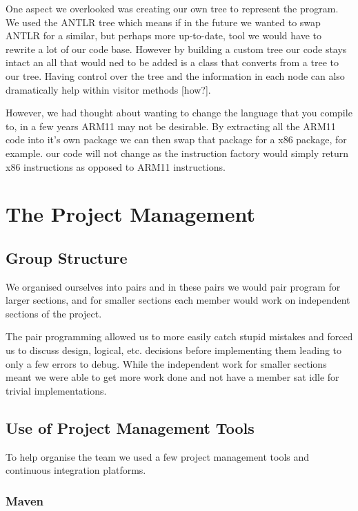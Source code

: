 \documentclass[11pt,a4paper]{article}
\begin{document}
One aspect we overlooked was creating our own tree to represent the program. We used the ANTLR tree which means if in the future we wanted to swap ANTLR for a similar, but perhaps more up-to-date, tool we would have to rewrite a lot of our code base. However by building a custom tree our code stays intact an all that would ned to be added is a class that converts from a tree to our tree. Having control over the tree and the information in each node can also dramatically help within visitor methods [how?].

However, we had thought about wanting to change the language that you compile to, in a few years ARM11 may not be desirable. By extracting all the ARM11 code into it's own package we can then swap that package for a x86 package, for example. our code will not change as the instruction factory would simply return x86 instructions as opposed to ARM11 instructions.

\section{The Project Management}
\label{sec:The Project Management}

\subsection{Group Structure}
\label{sub:Group Structure}

We organised ourselves into pairs and in these pairs we would pair program for larger sections, and for smaller sections each member would work on independent sections of the project.

The pair programming allowed us to more easily catch stupid mistakes and forced us to discuss design, logical, etc. decisions before implementing them leading to only a few errors to debug. While the independent work for smaller sections meant we were able to get more work done and not have a member sat idle for trivial implementations.

\subsection{Use of Project Management Tools}
\label{sub:Use of Project Management Tools}

To help organise the team we used a few project management tools and continuous integration platforms.

\subsubsection{Maven}
\label{subs:Maven}
\end{document}
